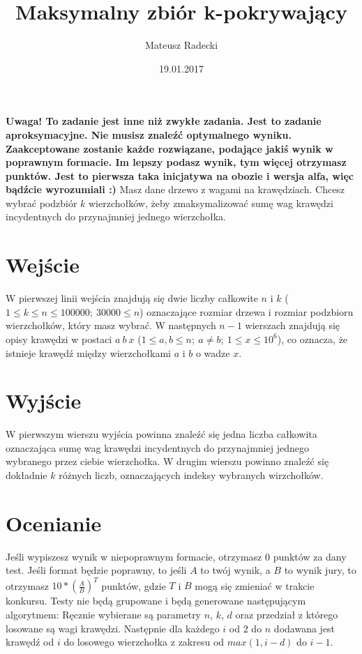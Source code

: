 \documentclass[zad,zawodnik,utf8]{sinol}
\title{Maksymalny zbiór k-pokrywający}
\author{Mateusz Radecki} %
\date{19.01.2017}
\begin{document}
\begin{tasktext}%
    
	\textbf{Uwaga! To zadanie jest inne niż zwykłe zadania. Jest to zadanie aproksymacyjne. Nie musisz znaleźć optymalnego wyniku. Zaakceptowane zostanie każde rozwiązane, podające jakiś wynik w poprawnym formacie. Im lepszy podasz wynik, tym więcej otrzymasz punktów. Jest to pierwsza taka inicjatywa na obozie i wersja alfa, więc bądźcie wyrozumiali :)}
\vskip 3mm
    Masz dane drzewo z wagami na krawędziach. Chcesz wybrać podzbiór $k$ wierzchołków, żeby zmaksymalizować sumę wag krawędzi incydentnych do przynajmniej jednego wierzchołka.


  \section{Wejście}

   W pierwszej linii wejścia znajdują się dwie liczby całkowite $n$ i $k$ ($1 \leq k \leq n \leq 100000;~ 30000 \leq n$) oznaczające rozmiar drzewa i rozmiar podzbioru wierzchołków, który masz wybrać. W następnych $n-1$ wierszach znajdują się opisy krawędzi w postaci $a~b~x$ ($1 \leq a,b \leq n;~ a \neq b;~ 1 \leq x \leq 10^6$), co oznacza, że istnieje krawędź między wierzchołkami $a$ i $b$ o wadze $x$.

  \section{Wyjście}
   
\vskip 1mm
   W pierwszym wierszu wyjścia powinna znaleźć się jedna liczba całkowita oznaczająca sumę wag krawędzi incydentnych do przynajmniej jednego wybranego przez ciebie wierzchołka.
\vskip 1mm
   W drugim wierszu powinno znaleźć się dokładnie $k$ różnych liczb, oznaczających indeksy wybranych wirzchołków.

  \section{Ocenianie}
   
\vskip 1mm
   Jeśli wypiszesz wynik w niepoprawnym formacie, otrzymasz $0$ punktów za dany test.
\vskip 1mm
   Jeśli format będzie poprawny, to jeśli $A$ to twój wynik, a $B$ to wynik jury, to otrzymasz $10*(\frac{A}{B})^T$ punktów, gdzie $T$ i $B$ mogą się zmieniać w trakcie konkursu.
\vskip 1mm
   Testy nie będą grupowane i będą generowane następującym algorytmem:
   Ręcznie wybierane są parametry $n$, $k$, $d$ oraz przedział z którego losowane są wagi krawędzi. Następnie dla każdego $i$ od $2$ do $n$ dodawana jest krawędź od $i$ do losowego wierzchołka z zakresu od $max(1, i-d)$ do $i-1$.

  
\makecompactexample

\end{tasktext}
\end{document}
